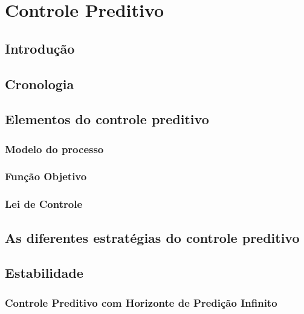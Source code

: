 \chapter{Controle Preditivo}

\section{Introdução}


\section{Cronologia}


\section{Elementos do controle preditivo}


\subsection{Modelo do processo}


\subsection{Função Objetivo}


\subsection{Lei de Controle}


\section{As diferentes estratégias do controle preditivo}


\section{Estabilidade}


\subsection{Controle Preditivo com Horizonte de Predição Infinito}

